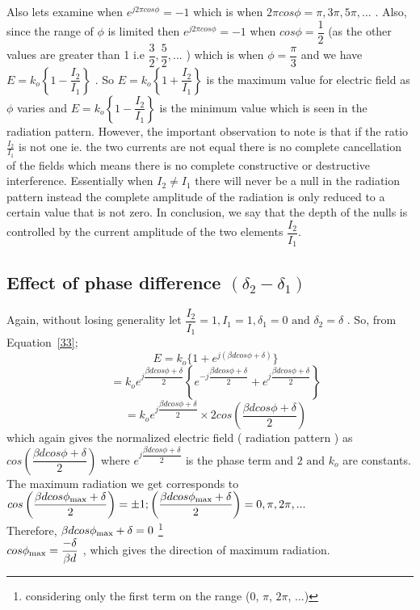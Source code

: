Also lets examine when  $ e^{j 2 \pi cos\phi} = - 1 $ which is when $ 2 \pi cos\phi = \pi, 3 \pi, 5 \pi,... $ . Also, since the range of $ \phi $ is limited then $ e^{j 2 \pi cos\phi} = - 1 $ when $ cos\phi = \dfrac{ 1 }{ 2 } $ (as the other values are greater than 1 i.e $ \dfrac{ 3 }{ 2 }, \dfrac{ 5 }{ 2 }, ... $ ) which is when $ \phi = \dfrac{ \pi }{ 3 } $ and we have $ E  = k_o \left\{ 1 - \dfrac{I_2}{I_1} \right\} $ . So $ E  = k_o \left\{ 1 + \dfrac{I_2}{I_1} \right\} $ is the maximum value for electric field as  $ \phi $ varies and $ E  = k_o \left\{ 1 - \dfrac{I_2}{I_1} \right\} $ is the minimum value which is seen in the radiation pattern. However, the important observation to note is that if the ratio $\frac{I_2}{I_1}$ is not one ie. the two currents are not equal there is no complete cancellation of the fields which means there is no complete constructive or destructive interference. Essentially when $ I_2 \neq I_1 $ there will never be a null in the radiation pattern instead the complete amplitude of the radiation is only reduced to a certain value that is not zero. In conclusion, we say that the depth of the nulls is controlled by the current amplitude of the two elements $ \dfrac{ I_2 }{ I_1 } $.

\subsection{Effect of phase difference $ ( \delta_2 - \delta_1 ) $ }
Again, without losing generality let $ \dfrac{ I_2 }{ I_1 } = 1, I_1 = 1, \delta_1 = 0 \text{ and } \delta_2 = \delta $ . So, from Equation~\ref{33};
$$
\quad E = k_o \{ 1 + e^{j ( \beta dcos\phi + \delta)} \}
$$
$$
\quad = k_o e^{j \dfrac{ \beta dcos\phi + \delta }{ 2 } } \left\{ e^{ -j \dfrac{ \beta dcos\phi + \delta }{ 2 } } + e^{j \dfrac{ \beta dcos\phi + \delta }{ 2 } } \right\}
$$
\begin{equation}
\quad = k_o e^{j \dfrac{ \beta dcos\phi + \delta }{ 2 } } \times 2 cos \left( \dfrac{ \beta dcos\phi + \delta }{ 2 } \right) 
\end{equation}
which again gives the normalized electric field ( radiation pattern ) as $ cos \left( \dfrac{ \beta dcos\phi + \delta }{ 2 } \right) $ where $  e^{j \dfrac{ \beta dcos\phi + \delta }{ 2 } } $ is the phase term and $ 2 \text{ and } k_o $ are constants. The maximum radiation we get corresponds to $  cos \left( \dfrac{ \beta dcos\phi_ {\textnormal{max}} + \delta }{ 2 } \right) = \pm 1 ;   \left( \dfrac{ \beta dcos\phi_ {\textnormal{max}} + \delta }{ 2 } \right) = 0, \pi, 2 \pi,... $ \\ Therefore, $\beta dcos\phi_ {\textnormal{max}} + \delta = 0 $ \footnote{considering only the first term on the range (0, $\pi$, $2\pi$, ...)}\\
$ cos\phi_ {\textnormal{max}} = \dfrac{ - \delta }{ \beta d } $ , which gives the direction of maximum radiation. 

